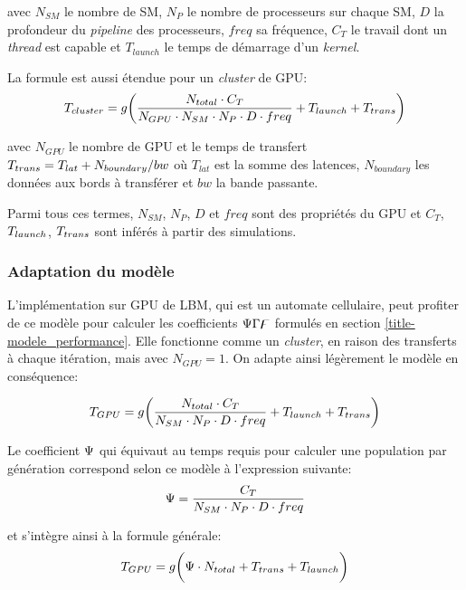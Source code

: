 avec $N_{SM}$ le nombre de \ac{SM}, $N_P$ le nombre de processeurs sur chaque \ac{SM}, $D$ la profondeur du \textit{pipeline} des processeurs, $freq$ sa fréquence, $C_T$ le travail dont un \textit{thread} est capable et $T_{launch}$ le temps de démarrage d'un \textit{kernel}.

La formule est aussi étendue pour un \textit{cluster} de \acs{GPU}:
\begin{equation}
T_{cluster} = g \bigg( \frac{N_{total}\cdot C_T}{N_{GPU} \cdot N_{SM}\cdot N_P \cdot D \cdot freq} + T_{launch}+ T_{trans}\bigg)
\end{equation}

avec $N_{GPU}$ le nombre de \acs{GPU} et le temps de transfert $T_{trans} = T_{lat}+ N_{boundary}/bw$ où $T_{lat}$ est la somme des latences, $N_{boundary}$ les données aux bords à transférer et $bw$ la bande passante. 

Parmi tous ces termes, $N_{SM}$, $N_P$, $D$ et $freq$ sont des propriétés du \acs{GPU} et $C_T$, $T_{launch}$, $T_{trans}$ sont inférés à partir des simulations.
\subsubsection{Adaptation du modèle}
L'implémentation sur \acs{GPU} de \ac{LBM}, qui est un automate cellulaire, peut profiter de ce modèle pour calculer les coefficients $\Psi\Gamma\digamma$ formulés en section \ref{title-modele_performance}.  Elle fonctionne comme un \textit{cluster}, en raison des transferts à chaque itération, mais avec $N_{GPU}=1$. On adapte ainsi légèrement le modèle en conséquence:

\begin{equation}
T_{GPU} = g \bigg( \frac{N_{total}\cdot C_T}{N_{SM}\cdot N_P \cdot D \cdot freq} + T_{launch} + T_{trans}\bigg)
\end{equation}

Le coefficient $\Psi$ qui équivaut au temps requis pour calculer une population par génération correspond selon ce modèle à l'expression suivante:
\begin{equation}
\Psi= \frac{C_T}{N_{SM}\cdot N_P \cdot D \cdot freq}
\end{equation}

et s'intègre ainsi à la formule générale:
\begin{equation}
T_{GPU} = g \bigg( \Psi \cdot N_{total} + T_{trans} + T_{launch}  \bigg)
\end{equation}

